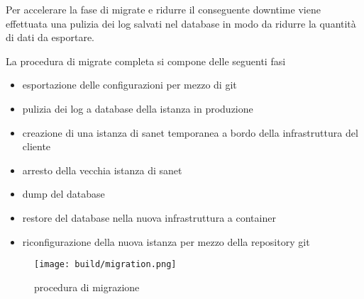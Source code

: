 Per accelerare la fase di migrate e ridurre il conseguente downtime viene effettuata una pulizia  dei log salvati nel database in modo da ridurre la quantità di dati da esportare.

La procedura di migrate completa si compone delle seguenti fasi


\begin{itemize}
  \item{esportazione delle configurazioni per mezzo di git}
  \item{pulizia dei log a database della istanza in produzione}
  \item{creazione di una istanza di sanet temporanea a bordo della infrastruttura del cliente}
  \item{arresto della vecchia istanza di sanet}
  \item{dump del database}
  \item{restore del database nella nuova infrastruttura a container}
  \item{riconfigurazione della nuova istanza per mezzo della repository git}
\end{itemize}


\begin{figure}[H]
    \centering
    \texttt{[image: build/migration.png]}
    \caption{procedura di migrazione}
    \label{fig:enter-label}
\end{figure}


